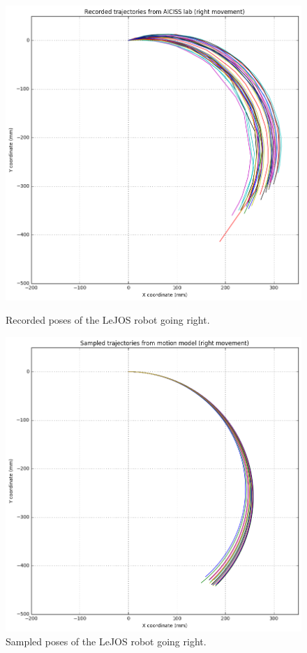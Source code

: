\documentclass[paper=a4, fontsize=11pt]{scrartcl} %
\begin{document}
    \begin{figure}[h!]
        \centering
        \begin{minipage}{0.5\textwidth}
            \centering
            \includegraphics[width=1\textwidth]{images/recorded_poses_right.png} %
            \caption{Recorded poses of the LeJOS robot going right.}
        \end{minipage}\hfill
        \begin{minipage}{0.5\textwidth}
            \centering
            \includegraphics[width=1\textwidth]{images/sampled_poses_right.png} %
            \caption{Sampled poses of the LeJOS robot going right.}
        \end{minipage}
    \end{figure}
\end{document}
